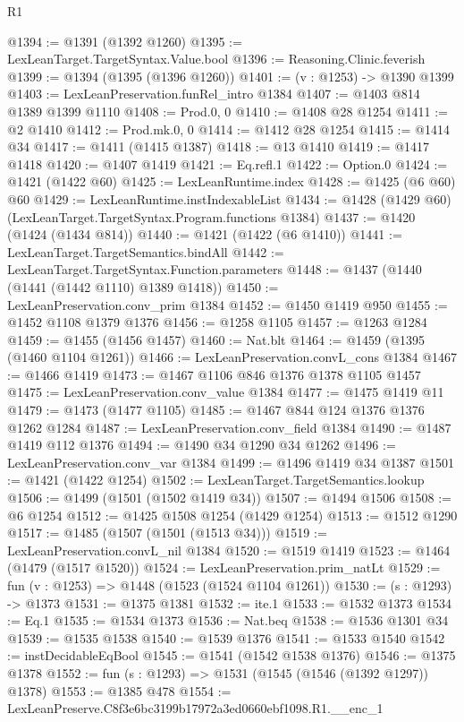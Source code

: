 \begin{lexlean}{R1}
\begin{coremodule}
@1394 := @1391 (@1392 @1260)
@1395 := LexLeanTarget.TargetSyntax.Value.bool
@1396 := Reasoning.Clinic.feverish
@1399 := @1394 (@1395 (@1396 @1260))
@1401 := (v : @1253) -> @1390 @1399
@1403 := LexLeanPreservation.funRel_intro @1384
@1407 := @1403 @814 @1389 @1399 @1110
@1408 := Prod.{0, 0}
@1410 := @1408 @28 @1254
@1411 := @2 @1410
@1412 := Prod.mk.{0, 0}
@1414 := @1412 @28 @1254
@1415 := @1414 @34
@1417 := @1411 (@1415 @1387)
@1418 := @13 @1410
@1419 := @1417 @1418
@1420 := @1407 @1419
@1421 := Eq.refl.{1}
@1422 := Option.{0}
@1424 := @1421 (@1422 @60)
@1425 := LexLeanRuntime.index
@1428 := @1425 (@6 @60) @60
@1429 := LexLeanRuntime.instIndexableList
@1434 := @1428 (@1429 @60) (LexLeanTarget.TargetSyntax.Program.functions @1384)
@1437 := @1420 (@1424 (@1434 @814))
@1440 := @1421 (@1422 (@6 @1410))
@1441 := LexLeanTarget.TargetSemantics.bindAll
@1442 := LexLeanTarget.TargetSyntax.Function.parameters
@1448 := @1437 (@1440 (@1441 (@1442 @1110) @1389 @1418))
@1450 := LexLeanPreservation.conv_prim @1384
@1452 := @1450 @1419 @950
@1455 := @1452 @1108 @1379 @1376
@1456 := @1258 @1105
@1457 := @1263 @1284
@1459 := @1455 (@1456 @1457)
@1460 := Nat.blt
@1464 := @1459 (@1395 (@1460 @1104 @1261))
@1466 := LexLeanPreservation.convL_cons @1384
@1467 := @1466 @1419
@1473 := @1467 @1106 @846 @1376 @1378 @1105 @1457
@1475 := LexLeanPreservation.conv_value @1384
@1477 := @1475 @1419 @11
@1479 := @1473 (@1477 @1105)
@1485 := @1467 @844 @124 @1376 @1376 @1262 @1284
@1487 := LexLeanPreservation.conv_field @1384
@1490 := @1487 @1419 @112 @1376
@1494 := @1490 @34 @1290 @34 @1262
@1496 := LexLeanPreservation.conv_var @1384
@1499 := @1496 @1419 @34 @1387
@1501 := @1421 (@1422 @1254)
@1502 := LexLeanTarget.TargetSemantics.lookup
@1506 := @1499 (@1501 (@1502 @1419 @34))
@1507 := @1494 @1506
@1508 := @6 @1254
@1512 := @1425 @1508 @1254 (@1429 @1254)
@1513 := @1512 @1290
@1517 := @1485 (@1507 (@1501 (@1513 @34)))
@1519 := LexLeanPreservation.convL_nil @1384
@1520 := @1519 @1419
@1523 := @1464 (@1479 (@1517 @1520))
@1524 := LexLeanPreservation.prim_natLt
@1529 := fun (v : @1253) => @1448 (@1523 (@1524 @1104 @1261))
@1530 := (s : @1293) -> @1373
@1531 := @1375 @1381
@1532 := ite.{1}
@1533 := @1532 @1373
@1534 := Eq.{1}
@1535 := @1534 @1373
@1536 := Nat.beq
@1538 := @1536 @1301 @34
@1539 := @1535 @1538
@1540 := @1539 @1376
@1541 := @1533 @1540
@1542 := instDecidableEqBool
@1545 := @1541 (@1542 @1538 @1376)
@1546 := @1375 @1378
@1552 := fun (s : @1293) => @1531 (@1545 (@1546 (@1392 @1297)) @1378)
@1553 := @1385 @478
@1554 := LexLeanPreserve.C8f3e6bc3199b17972a3ed0660ebf1098.R1.__enc_1

\end{coremodule}
\end{lexlean}

